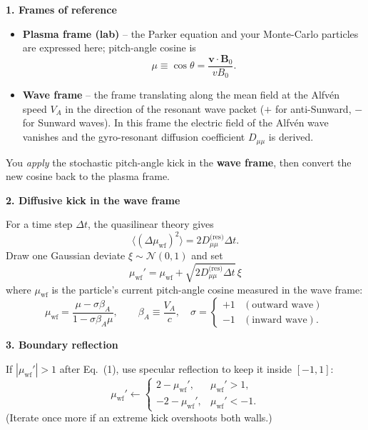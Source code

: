 \begin{tcolorbox}[colback=white, colframe=black, title={Pitch–Angle Cosine After a Single Monte-Carlo Scattering Step}]

\textbf{1. Frames of reference}
\begin{itemize}
\item \textbf{Plasma frame (lab)} – the Parker equation and your Monte-Carlo particles are expressed here; pitch-angle cosine is
\[
\mu \equiv \cos\theta = \frac{\mathbf{v} \cdot \mathbf{B}_0}{v B_0}.
\]
\item \textbf{Wave frame} – the frame translating along the mean field at the Alfvén speed $V_A$ in the direction of the resonant wave packet ($+$ for anti-Sunward, $-$ for Sunward waves).
In this frame the electric field of the Alfvén wave vanishes and the gyro-resonant diffusion coefficient $D_{\mu\mu}$ is derived.
\end{itemize}

You \emph{apply} the stochastic pitch-angle kick in the \textbf{wave frame}, then convert the new cosine back to the plasma frame.

\medskip

\textbf{2. Diffusive kick in the wave frame}

For a time step $\Delta t$, the quasilinear theory gives
\[
\langle(\Delta \mu_{\text{wf}})^2\rangle = 2 D_{\mu\mu}^{\text{(res)}} \Delta t.
\]
Draw one Gaussian deviate $\xi \sim \mathcal{N}(0,1)$ and set
\begin{equation}
\boxed{
\mu_{\text{wf}}' = \mu_{\text{wf}} + \sqrt{2 D_{\mu\mu}^{\text{(res)}} \Delta t} \, \xi
}
\tag{1}
\end{equation}
where $\mu_{\text{wf}}$ is the particle’s current pitch-angle cosine measured in the wave frame:
\[
\mu_{\text{wf}} = \frac{\mu - \sigma \beta_A}{1 - \sigma \beta_A \mu},
\qquad
\beta_A \equiv \frac{V_A}{c}, \quad
\sigma = \begin{cases}
+1 & (\text{outward wave})\\[3pt]
-1 & (\text{inward wave}).
\end{cases}
\]

\medskip

\textbf{3. Boundary reflection}

If $|\mu_{\text{wf}}'| > 1$ after Eq.~(1), use specular reflection to keep it inside $[-1,1]$:
\[
\mu_{\text{wf}}' \gets
\begin{cases}
2 - \mu_{\text{wf}}', & \mu_{\text{wf}}' > 1, \\[2pt]
-2 - \mu_{\text{wf}}', & \mu_{\text{wf}}' < -1.
\end{cases}
\]
(Iterate once more if an extreme kick overshoots both walls.)


\end{tcolorbox}
